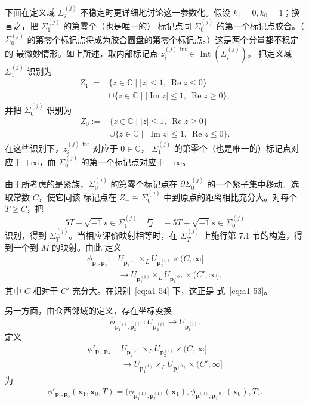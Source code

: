 下面在定义域 $\Sigma_i^{(j)}$ 不稳定时更详细地讨论这一参数化。假设
$k_1=0,k_0=1$；换言之，把 $\Sigma_1^{(j)}$ 的第零个（也是唯一的）
标记点同 $\Sigma_0^{(j)}$ 的第一个标记点胶合。（$\Sigma_0^{(j)}$
的第零个标记点将成为胶合圆盘的第零个标记点。）这是两个分量都不稳定的
最微妙情形。如上所述，取内部标记点
$z_i^{(j),\mathrm{int}}\in\operatorname{Int}(\Sigma_i^{(j)})$。
把定义域 $\Sigma_1^{(j)}$ 识别为
\begin{equation}
 \begin{aligned}
 Z_1:={}&\{z\in\mathbb C\mid |z|\leq1,\ \operatorname{Re}z\leq0\}\\
 &\cup\{z\in\mathbb C\mid |\operatorname{Im}z|\leq1,\
              \operatorname{Re}z\geq0\},
 \end{aligned}
\tag{A1.55.1}\label{eq:a1-55-1}
\end{equation}
并把 $\Sigma_0^{(j)}$ 识别为
\begin{equation}
 \begin{aligned}
 Z_0:={}&\{z\in\mathbb C\mid |z|\leq1,\ \operatorname{Re}z\geq0\}\\
 &\cup\{z\in\mathbb C\mid |\operatorname{Im}z|\leq1,\
              \operatorname{Re}z\leq0\}.
 \end{aligned}
\tag{A1.55.2}\label{eq:a1-55-2}
\end{equation}
在这些识别下，$z_i^{(j),\mathrm{int}}$ 对应于 $0\in\mathbb C$，
$\Sigma_1^{(j)}$ 的第零个（也是唯一的）标记点对应于 $+\infty$，而
$\Sigma_0^{(j)}$ 的第一个标记点对应于 $-\infty$。

由于所考虑的是紧族，$\Sigma_0^{(j)}$ 的第零个标记点在
$\partial\Sigma_0^{(j)}$ 的一个紧子集中移动。选取常数 $C$，使它同该
标记点在 $Z_-\cong\Sigma_0^{(j)}$ 中到原点的距离相比充分大。对每个
$T\geq C$，把
\[
 5T+\sqrt{-1}s\in\Sigma_1^{(j)}
 \quad\text{与}\quad
 -5T+\sqrt{-1}s\in\Sigma_0^{(j)}
\]
识别，得到 $\Sigma_T^{(j)}$。当相应评价映射相等时，在
$\Sigma_T^{(j)}$ 上施行第 7.1 节的构造，得到一个到 $M$ 的映射。由此
定义
\[
 \begin{aligned}
 \phi_{\mathbf p_1,\mathbf p_2}\colon{}
 &U_{\mathbf p_2^{(1)}}\mathbin{\times_L}
  U_{\mathbf p_2^{(0)}}\times(C,\infty]\\
 &\longrightarrow
 U_{\mathbf p_1^{(1)}}\mathbin{\times_L}
 U_{\mathbf p_1^{(0)}}\times(C',\infty],
 \end{aligned}
\]
其中 $C$ 相对于 $C'$ 充分大。在识别~\eqref{eq:a1-54} 下，这正是
式~\eqref{eq:a1-53}。

另一方面，由仓西邻域的定义，存在坐标变换
\[
 \overline\phi_{\mathbf p_1^{(i)},\mathbf p_2^{(i)}}\colon
 U_{\mathbf p_2^{(i)}}\longrightarrow U_{\mathbf p_1^{(i)}}.
\]
定义
\[
 \begin{aligned}
 \phi'_{\mathbf p_1,\mathbf p_2}\colon{}
 &U_{\mathbf p_2^{(1)}}\mathbin{\times_L}
  U_{\mathbf p_2^{(0)}}\times(C,\infty]\\
 &\longrightarrow
 U_{\mathbf p_1^{(1)}}\mathbin{\times_L}
 U_{\mathbf p_1^{(0)}}\times(C',\infty]
 \end{aligned}
\]
为
\[
 \phi'_{\mathbf p_1,\mathbf p_2}(\mathbf x_1,\mathbf x_0,T)
 =\bigl(
 \overline\phi_{\mathbf p_1^{(1)},\mathbf p_2^{(1)}}(\mathbf x_1),
 \overline\phi_{\mathbf p_1^{(0)},\mathbf p_2^{(0)}}(\mathbf x_0),T
 \bigr).
\]

